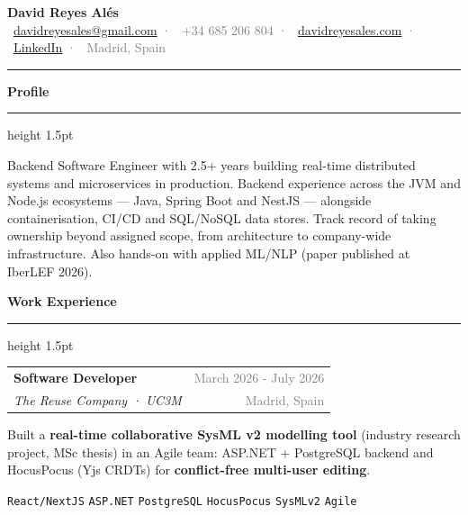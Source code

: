 \documentclass[9.5pt, a4paper]{article}
\newcommand{\cvsection}[1]{%
    \vspace{0.2cm}
    {\large \textbf{\textcolor{primary}{#1}}}
    \vspace{0.05cm}
    \textcolor{accent}{\hrule height 1.5pt}
    \vspace{0.1cm}
}
\newcommand{\cventry}[4]{%
    \noindent
    \begin{tabularx}{\textwidth}{Xr}
        \textbf{\textcolor{primary}{#1}} & \textcolor{gray}{\small #2} \\
        \textit{\textcolor{accent}{#3}} & \textcolor{gray}{\small #4}
    \end{tabularx}
    \vspace{0.1cm}
}
\newcommand{\tag}[1]{%
    \colorbox{tagbg}{\textcolor{accent}{\small\texttt{#1}}}%
}
\begin{document}
\begin{center}
    {\LARGE \textbf{\textcolor{primary}{David Reyes Alés}}}
    \quad{\large \textcolor{accent}{Backend Software Engineer · Distributed Systems · Real-time}}\\[5pt]
    \textcolor{gray}{\small
        \faEnvelope\ \href{mailto:davidreyesales@gmail.com}{davidreyesales@gmail.com}
        \textcolor{accent}{·}
        \faPhone\ +34 685 206 804
        \textcolor{accent}{·}
        \faGlobe\ \href{https://www.davidreyesales.com}{davidreyesales.com}
        \textcolor{accent}{·}
        \faLinkedin\ \href{https://www.linkedin.com/in/david-reyes-ales/}{LinkedIn}
        \textcolor{accent}{·}
        \faMapMarker*\ Madrid, Spain
    }
\end{center}

\vspace{0.1cm}
\noindent\textcolor{accent}{\rule{\linewidth}{2pt}}
\vspace{0.05cm}

\cvsection{Profile}

\noindent
Backend Software Engineer with 2.5+ years building real-time distributed systems and microservices in production. Backend experience across the JVM and Node.js ecosystems — Java, Spring Boot and NestJS — alongside containerisation, CI/CD and SQL/NoSQL data stores. Track record of taking ownership beyond assigned scope, from architecture to company-wide infrastructure. Also hands-on with applied ML/NLP (paper published at IberLEF 2026).

\cvsection{Work Experience}

\cventry{Software Developer}{March 2026 - July 2026}{The Reuse Company · UC3M}{Madrid, Spain}

\noindent Built a \textbf{real-time collaborative SysML v2 modelling tool} (industry research project, MSc thesis) in an Agile team: ASP.NET + PostgreSQL backend and HocusPocus (Yjs CRDTs) for \textbf{conflict-free multi-user editing}.

\vspace{0.1cm}
\noindent \tag{React/NextJS} \tag{ASP.NET} \tag{PostgreSQL} \tag{HocusPocus} \tag{SysMLv2} \tag{Agile}

\vspace{0.25cm}
\end{document}
